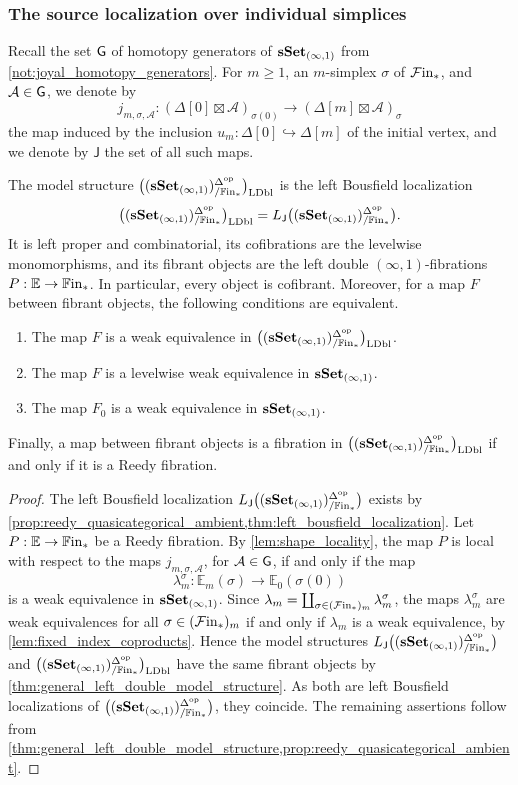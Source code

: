 \documentclass[10pt,reqno]{amsart}
\begin{document}
\subsubsection{The source localization over individual simplices}
\label{subsubsec:left_double_model_structure}

Recall the set $\mathsf G$ of homotopy generators of
$\mathbf{sSet}_{(\infty,1)}$ from \cref{not:joyal_homotopy_generators}. For
$m\geq1$, an $m$-simplex $\sigma$ of $\mathcal{F}\mathrm{in}_*$, and
$\mathcal A\in\mathsf G$, we denote by
\[
j_{m,\sigma,\mathcal A}:
(\Delta[0]\boxtimes\mathcal A)_{\sigma(0)}
\longrightarrow(\Delta[m]\boxtimes\mathcal A)_\sigma
\]
the map induced by the inclusion
$u_m:\Delta[0]\hookrightarrow\Delta[m]$ of the initial vertex, and
we denote by $\mathsf J$ the set of all such maps.

\begin{theorem}
\label{thm:left_double_model_structure}
The model structure $\bigl((\mathbf{sSet}_{(\infty,1)})^{\Delta^{\mathrm{op}}}_{/\mathbb{F}\mathrm{in}_*}\bigr)_{\mathrm{LDbl}}$ is the left Bousfield localization
\[
\bigl((\mathbf{sSet}_{(\infty,1)})^{\Delta^{\mathrm{op}}}_{/\mathbb{F}\mathrm{in}_*}\bigr)_{\mathrm{LDbl}}=L_{\mathsf J}\bigl((\mathbf{sSet}_{(\infty,1)})^{\Delta^{\mathrm{op}}}_{/\mathbb{F}\mathrm{in}_*}\bigr).
\]
It is left proper and combinatorial, its cofibrations are the
levelwise monomorphisms, and its fibrant objects are the left double
$(\infty,1)$-fibrations $P:\mathbb E\to\mathbb{F}\mathrm{in}_*$. In particular,
every object is cofibrant. Moreover, for a map $F$ between fibrant
objects, the following conditions are equivalent.
\begin{enumerate}[label=\textup{(\roman*)}]
\item The map $F$ is a weak equivalence in $\bigl((\mathbf{sSet}_{(\infty,1)})^{\Delta^{\mathrm{op}}}_{/\mathbb{F}\mathrm{in}_*}\bigr)_{\mathrm{LDbl}}$.
\item The map $F$ is a levelwise weak equivalence in
      $\mathbf{sSet}_{(\infty,1)}$.
\item The map $F_0$ is a weak equivalence in
      $\mathbf{sSet}_{(\infty,1)}$.
\end{enumerate}
Finally, a map between fibrant objects is a fibration in $\bigl((\mathbf{sSet}_{(\infty,1)})^{\Delta^{\mathrm{op}}}_{/\mathbb{F}\mathrm{in}_*}\bigr)_{\mathrm{LDbl}}$
if and only if it is a Reedy fibration.
\end{theorem}

\begin{proof}
The left Bousfield localization $L_{\mathsf J}\bigl((\mathbf{sSet}_{(\infty,1)})^{\Delta^{\mathrm{op}}}_{/\mathbb{F}\mathrm{in}_*}\bigr)$ exists by
\cref{prop:reedy_quasicategorical_ambient,thm:left_bousfield_localization}.
Let $P:\mathbb E\to\mathbb{F}\mathrm{in}_*$ be a Reedy fibration. By
\cref{lem:shape_locality}, the map $P$ is local with respect to the
maps $j_{m,\sigma,\mathcal A}$, for $\mathcal A\in\mathsf G$, if and
only if the map
\[
\lambda_m^\sigma:
\mathbb E_m(\sigma)\longrightarrow\mathbb E_0(\sigma(0))
\]
is a weak equivalence in $\mathbf{sSet}_{(\infty,1)}$. Since
$\lambda_m=\coprod_{\sigma\in(\mathcal{F}\mathrm{in}_*)_m}\lambda_m^\sigma$, the maps
$\lambda_m^\sigma$ are weak equivalences for all
$\sigma\in(\mathcal{F}\mathrm{in}_*)_m$ if and only if $\lambda_m$ is a weak
equivalence, by \cref{lem:fixed_index_coproducts}. Hence the model
structures $L_{\mathsf J}\bigl((\mathbf{sSet}_{(\infty,1)})^{\Delta^{\mathrm{op}}}_{/\mathbb{F}\mathrm{in}_*}\bigr)$ and $\bigl((\mathbf{sSet}_{(\infty,1)})^{\Delta^{\mathrm{op}}}_{/\mathbb{F}\mathrm{in}_*}\bigr)_{\mathrm{LDbl}}$ have the same
fibrant objects by \cref{thm:general_left_double_model_structure}. As
both are left Bousfield localizations of $\bigl((\mathbf{sSet}_{(\infty,1)})^{\Delta^{\mathrm{op}}}_{/\mathbb{F}\mathrm{in}_*}\bigr)$, they
coincide. The remaining assertions follow from
\cref{thm:general_left_double_model_structure,prop:reedy_quasicategorical_ambient}.
\end{proof}
\end{document}
